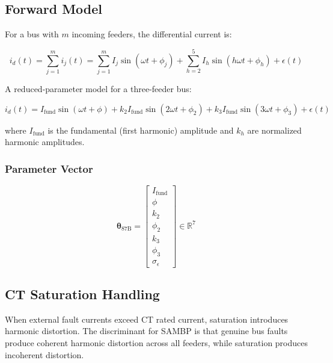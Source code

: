 \documentclass[12pt,a4paper]{article}
\newcommand{\thetaB}{\boldsymbol{\theta}_{\text{87B}}}
\begin{document}
\subsection{Forward Model}
\label{subsec:87b_model}

For a bus with $m$ incoming feeders, the differential current is:

\begin{equation}
i_d(t) = \sum_{j=1}^{m} i_j(t) = \sum_{j=1}^{m} I_j \sin(\omega t + \phi_j) + \sum_{h=2}^{5} I_{h} \sin(h\omega t + \phi_{h}) + \epsilon(t)
\label{eq:87b_signal}
\end{equation}

A reduced-parameter model for a three-feeder bus:

\begin{equation}
i_d(t) = I_{\text{fund}} \sin(\omega t + \phi) + k_2 I_{\text{fund}} \sin(2\omega t + \phi_2) + k_3 I_{\text{fund}} \sin(3\omega t + \phi_3) + \epsilon(t)
\label{eq:87b_reduced}
\end{equation}

where $I_{\text{fund}}$ is the fundamental (first harmonic) amplitude and $k_h$ are 
normalized harmonic amplitudes.

\subsubsection{Parameter Vector}

\begin{equation}
\thetaB = \begin{bmatrix} I_{\text{fund}} \\ \phi \\ k_2 \\ \phi_2 \\ k_3 \\ \phi_3 \\ \sigma_{\epsilon} \end{bmatrix} \in \mathbb{R}^{7}
\label{eq:87b_theta}
\end{equation}

\subsection{CT Saturation Handling}
\label{subsec:87b_ct_saturation}

When external fault currents exceed CT rated current, saturation introduces harmonic 
distortion. The discriminant for SAMBP is that genuine bus faults produce coherent 
harmonic distortion across all feeders, while saturation produces incoherent distortion.
\end{document}
